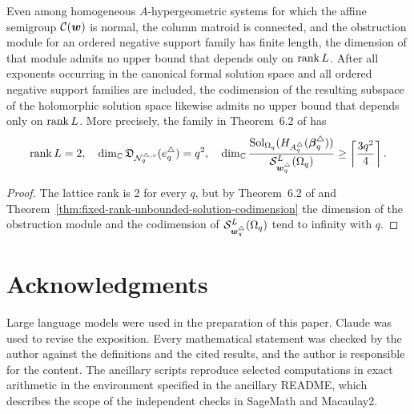 \begin{corollary}
	\label{cor:no-rank-only-obstruction-bound}
	Even among homogeneous \(A\)-hypergeometric systems for which the affine semigroup \(\mathcal C(\boldsymbol{w})\) is normal, the column matroid is connected, and the obstruction module for an ordered negative support family has finite length, the dimension of that module admits no upper bound that depends only on \(\operatorname{rank} L\).
	After all exponents occurring in the canonical formal solution space and all ordered negative support families are included, the codimension of the resulting subspace of the holomorphic solution space likewise admits no upper bound that depends only on \(\operatorname{rank} L\).
	More precisely, the family in Theorem~6.2 of \cite{Nak26} has
	\[
		\operatorname{rank} L = 2,\quad
		\dim_{\mathbb C}\mathfrak D_{\mathcal N_q^{\triangle,\circ}}(e_q^\triangle) =q^2,\quad
		\dim_{\mathbb C}\frac{\operatorname{Sol}_{\Omega_q}(H_{A_q^\triangle}(\boldsymbol{\beta}_q^\triangle))}{\mathcal S_{\boldsymbol{w}_q^\triangle}^{L}(\Omega_q)}\geq\left\lceil\frac{3q^2}{4}\right\rceil.
	\]
\end{corollary}

\begin{proof}
	The lattice rank is 2 for every \(q\), but by Theorem~6.2 of \cite{Nak26} and Theorem~\ref{thm:fixed-rank-unbounded-solution-codimension} the dimension of the obstruction module and the codimension of \(\mathcal S_{\boldsymbol{w}_q^\triangle}^{L}(\Omega_q)\) tend to infinity with \(q\).
\end{proof}
\section*{Acknowledgments}

Large language models were used in the preparation of this paper.
Claude was used to revise the exposition.
Every mathematical statement was checked by the author against the definitions and the cited results, and the author is responsible for the content.
\ifarxiv
The ancillary scripts reproduce selected computations in exact arithmetic in the environment specified in the ancillary README, which describes the scope of the independent checks in SageMath and Macaulay2.
\fi


